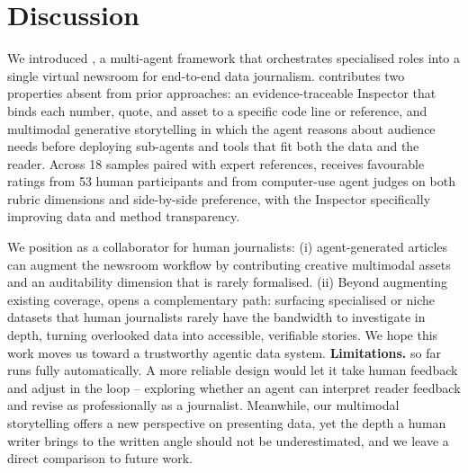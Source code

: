 \section{Discussion}
\label{sec:con}

We introduced \method, a multi-agent framework that orchestrates specialised roles into a single virtual newsroom for end-to-end data journalism. \methodshort{} contributes two properties absent from prior approaches: an evidence-traceable Inspector that binds each number, quote, and asset to a specific code line or reference, and multimodal generative storytelling in which the agent reasons about audience needs before deploying sub-agents and tools that fit both the data and the reader. 
Across 18 samples paired with expert references, \methodshort{} receives favourable ratings from 53 human participants and from computer-use agent judges on both rubric dimensions and side-by-side preference, with the Inspector specifically improving data and method transparency. 

We position \method{} as a collaborator for human journalists: 
(i) agent-generated articles can augment the newsroom workflow by contributing creative multimodal assets and an auditability dimension that is rarely formalised. 
(ii) Beyond augmenting existing coverage, \methodshort{} opens a complementary path: surfacing specialised or niche datasets that human journalists rarely have the bandwidth to investigate in depth, turning overlooked data into accessible, verifiable stories.
We hope this work moves us toward a trustworthy agentic data system.
\textbf{Limitations.}
\methodshort{} so far runs fully automatically. A more reliable design would let it take human feedback and adjust in the loop -- exploring whether an agent can interpret reader feedback and revise as professionally as a journalist.
Meanwhile, our multimodal storytelling offers a new perspective on presenting data, yet the depth a human writer brings to the written angle should not be underestimated, and we leave a direct comparison to future work.
